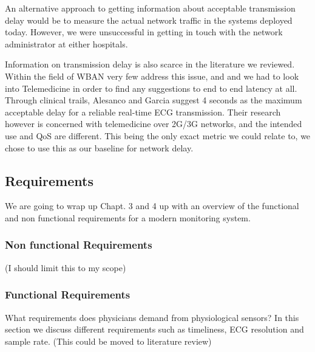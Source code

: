 An alternative approach to getting information about acceptable transmission delay would be to measure the actual network traffic in the systems deployed today. However, we were unsuccessful in getting in touch with the network administrator at either hospitals.

Information on transmission delay is also scarce in the literature we reviewed. Within the field of WBAN very few address this issue, and and we had to look into Telemedicine in order to find any suggestions to end to end latency at all. Through clinical trails, Alesanco and Garcia suggest 4 seconds as the maximum acceptable delay for a reliable real-time ECG transmission. Their research however is concerned with telemedicine over 2G/3G networks, and the intended use and QoS are different. This being the only exact metric we could relate to, we chose to use this as our baseline for network delay.



\subsection{Requirements} %
\label{sub:requirements}

We are going to wrap up Chapt. 3 and 4 up with an overview of the functional and non functional requirements for a modern monitoring system.

\subsubsection{Non functional Requirements} %
\label{ssub:non_functional_requirements}

(I should limit this to my scope)


\subsubsection{Functional Requirements} %
\label{ssub:functional_requirements}

What requirements does physicians demand from physiological sensors? In this section we discuss different requirements such as timeliness, ECG resolution and sample rate. (This could be moved to literature review)



